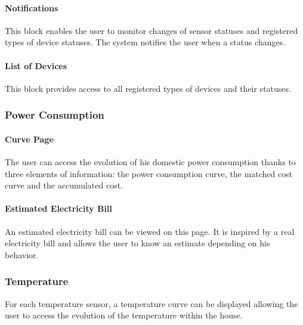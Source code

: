     \paragraph{Notifications}
    This block enables the user to monitor changes of sensor statuses and registered types of device statuses. The system notifies the user when a status changes.
    \paragraph{List of Devices} %
    This block provides access to all registered types of devices and their statuses.

\subsubsection{Power Consumption}

    \paragraph{Curve Page}
    The user can access the evolution of his domestic power consumption thanks to three elements of information: the power consumption curve, the matched cost curve and the accumulated cost.
    \paragraph{Estimated Electricity Bill}
    An estimated electricity bill can be viewed on this page. It is inspired by a real electricity bill and allows the user to know an estimate depending on his behavior.
\subsubsection{Temperature}
    For each temperature sensor, a temperature curve can be displayed allowing the user to access the evolution of the temperature within the house. 
